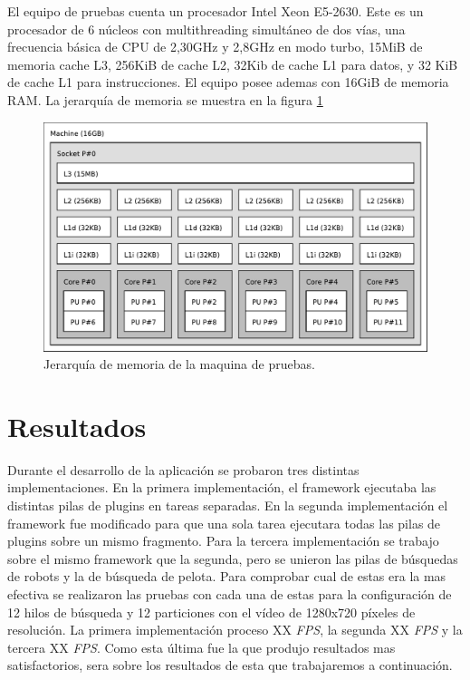 El equipo de pruebas cuenta un procesador Intel Xeon E5-2630. Este es un
procesador de 6 núcleos con multithreading simultáneo de dos vías, una
frecuencia básica de CPU de 2,30GHz y 2,8GHz en modo turbo, 15MiB de memoria
cache L3, 256KiB de cache L2, 32Kib de cache L1 para datos, y 32 KiB de cache L1
para instrucciones. El equipo posee ademas con 16GiB de memoria RAM. La
jerarquía de memoria se muestra en la figura \ref{topoMemoria}

\begin{figure}[!ht]

	\includegraphics[width=\textwidth]{img/topo.pdf}
	\caption{Jerarquía de memoria de la maquina de pruebas.}

	\label{topoMemoria}

\end{figure}

\section{Resultados}

Durante el desarrollo de la aplicación se probaron tres distintas
implementaciones. En la primera implementación, el framework ejecutaba las
distintas pilas de plugins en tareas separadas. En la segunda implementación el
framework fue modificado para que una sola tarea ejecutara todas las pilas de
plugins sobre un mismo fragmento. Para la tercera implementación se trabajo
sobre el mismo framework que la segunda, pero se unieron las pilas de búsquedas
de robots y la de búsqueda de pelota. Para comprobar cual de estas era la mas
efectiva se realizaron las pruebas con cada una de estas para la configuración
de 12 hilos de búsqueda y 12 particiones con el vídeo de 1280x720 píxeles de
resolución. La primera implementación proceso XX \emph{FPS}, la segunda XX
\emph{FPS} y la tercera XX \emph{FPS}. Como esta última fue la que produjo
resultados mas satisfactorios, sera sobre los resultados de esta que
trabajaremos a continuación.

